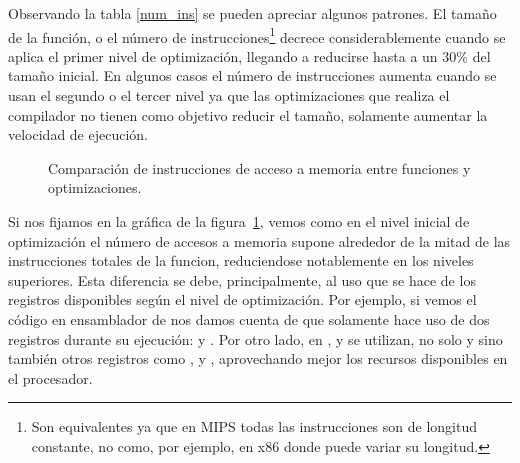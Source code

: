 Observando la tabla \ref{num_ins} se pueden apreciar algunos patrones. El tamaño de la función, o el número de instrucciones\footnote{Son equivalentes ya que en MIPS todas las instrucciones son de longitud constante, no como, por ejemplo, en x86 donde puede variar su longitud.} decrece considerablemente cuando se aplica el primer nivel de optimización, llegando a reducirse hasta a un 30\% del tamaño inicial. En algunos casos el número de instrucciones aumenta cuando se usan el segundo o el tercer nivel ya que las optimizaciones que realiza el compilador no tienen como objetivo reducir el tamaño, solamente aumentar la velocidad de ejecución.

\begin{figure}[htbp]
\begin{center}
\end{center}
\caption{Comparación de instrucciones de acceso a memoria entre funciones y optimizaciones.}
\label{graph:memoria}
\end{figure}

Si nos fijamos en la gráfica de la figura~\ref{graph:memoria}, vemos como en el nivel inicial de optimización el número de accesos a memoria supone alrededor de la mitad de las instrucciones totales de la funcion, reduciendose notablemente en los niveles superiores. Esta diferencia se debe, principalmente, al uso que se hace de los registros disponibles según el nivel de optimización. Por ejemplo, si vemos el código en ensamblador de  nos damos cuenta de que solamente hace uso de dos registros durante su ejecución:  y . Por otro lado, en ,  y  se utilizan, no solo  y  sino también otros registros como ,  y , aprovechando mejor los recursos disponibles en el procesador.

